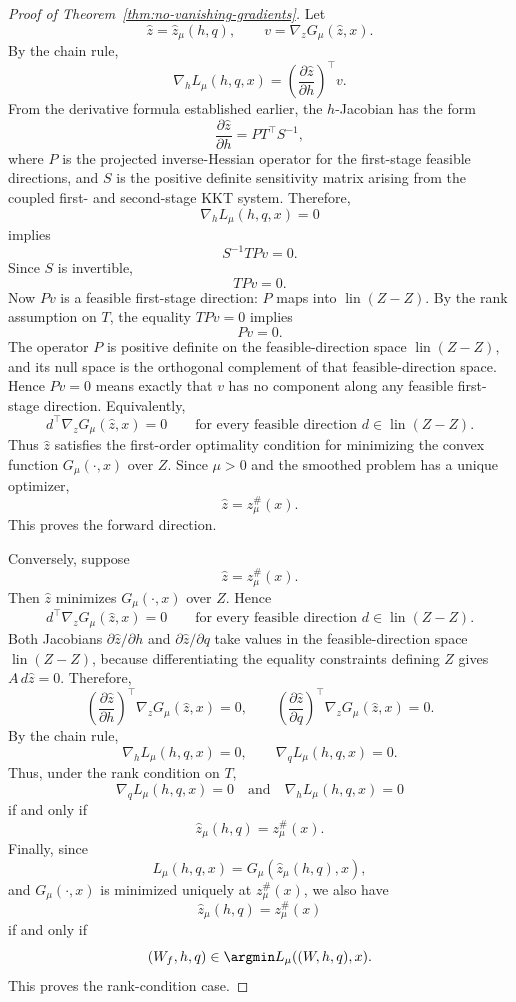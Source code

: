 \begin{proof}[Proof of Theorem~\ref{thm:no-vanishing-gradients}]
Let
\[
\hat z=\hat z_\mu(h,q),
\qquad
v=\nabla_zG_\mu(\hat z,x).
\]
By the chain rule,
\[
\nabla_h L_\mu(h,q,x)
=
\left(\frac{\partial\hat z}{\partial h}\right)^\top v.
\]
From the derivative formula established earlier, the $h$-Jacobian has the form
\[
\frac{\partial\hat z}{\partial h}
=
PT^\top S^{-1},
\]
where $P$ is the projected inverse-Hessian operator for the first-stage feasible directions, and $S$ is the positive definite sensitivity matrix arising from the coupled first- and second-stage KKT system. Therefore,
\[
\nabla_h L_\mu(h,q,x)=0
\]
implies
\[
S^{-1}TPv=0.
\]
Since $S$ is invertible,
\[
TPv=0.
\]
Now $Pv$ is a feasible first-stage direction: $P$ maps into $\operatorname{lin}(Z-Z)$. By the rank assumption on $T$, the equality $TPv=0$ implies
\[
Pv=0.
\]
The operator $P$ is positive definite on the feasible-direction space $\operatorname{lin}(Z-Z)$, and its null space is the orthogonal complement of that feasible-direction space. Hence $Pv=0$ means exactly that $v$ has no component along any feasible first-stage direction. Equivalently,
\[
d^\top\nabla_zG_\mu(\hat z,x)=0
\qquad
\text{for every feasible direction }d\in\operatorname{lin}(Z-Z).
\]
Thus $\hat z$ satisfies the first-order optimality condition for minimizing the convex function $G_\mu(\cdot,x)$ over $Z$. Since $\mu>0$ and the smoothed problem has a unique optimizer,
\[
\hat z=z_\mu^\#(x).
\]
This proves the forward direction.

Conversely, suppose
\[
\hat z=z_\mu^\#(x).
\]
Then $\hat z$ minimizes $G_\mu(\cdot,x)$ over $Z$. Hence
\[
d^\top\nabla_zG_\mu(\hat z,x)=0
\qquad
\text{for every feasible direction }d\in\operatorname{lin}(Z-Z).
\]
Both Jacobians $\partial\hat z/\partial h$ and $\partial\hat z/\partial q$ take values in the feasible-direction space $\operatorname{lin}(Z-Z)$, because differentiating the equality constraints defining $Z$ gives $A\,d\hat z=0$. Therefore,
\[
\left(\frac{\partial\hat z}{\partial h}\right)^\top
\nabla_zG_\mu(\hat z,x)=0,
\qquad
\left(\frac{\partial\hat z}{\partial q}\right)^\top
\nabla_zG_\mu(\hat z,x)=0.
\]
By the chain rule,
\[
\nabla_h L_\mu(h,q,x)=0,
\qquad
\nabla_q L_\mu(h,q,x)=0.
\]
Thus, under the rank condition on $T$,
\[
\nabla_q L_\mu(h,q,x)=0
\quad\text{and}\quad
\nabla_h L_\mu(h,q,x)=0
\]
if and only if
\[
\hat z_\mu(h,q)=z_\mu^\#(x).
\]
Finally, since
\[
L_\mu(h,q,x)=G_\mu(\hat z_\mu(h,q),x),
\]
and $G_\mu(\cdot,x)$ is minimized uniquely at $z_\mu^\#(x)$, we also have
\[
\hat z_\mu(h,q)=z_\mu^\#(x)
\]
if and only if
\[
(W_f,h,q)\in\argmin L_\mu((W,h,q),x).
\]
This proves the rank-condition case.


\end{proof}
